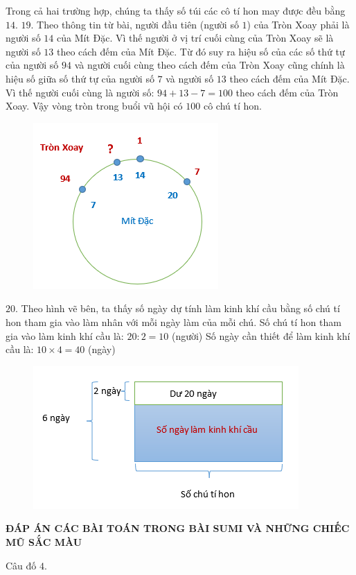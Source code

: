 Trong cả hai trường hợp, chúng ta thấy số túi các cô tí hon may được đều bằng $14$.
\vskip 0.1cm
$19$.
Theo thông tin từ bài, người đầu tiên (người số $1$) của Tròn Xoay phải là người số $14$ của Mít Đặc. Vì thế người ở vị trí cuối cùng của Tròn Xoay sẽ là người số $13$ theo cách đếm của Mít Đặc. Từ đó suy ra hiệu số của các số thứ tự của người số $94$ và người cuối cùng theo cách đếm của Tròn Xoay cũng chính là hiệu số giữa số thứ tự của người số $7$ và người số $13$  theo cách đếm của Mít Đặc. Vì thế người cuối cùng là người số: $94+ 13-7=100$ theo cách đếm của Tròn Xoay.
\vskip 0.1cm
Vậy vòng tròn trong buổi vũ hội có $100$ cô chú tí hon.
\begin{figure}[H]
	\centering
	\vspace*{-5pt}
	\captionsetup{labelformat= empty, justification=centering}
	\includegraphics[width=0.5\linewidth]{15}
	\vspace*{-15pt}
\end{figure}
$20.$ Theo hình vẽ bên, ta thấy số ngày dự tính làm kinh khí cầu bằng số chú tí hon tham gia vào làm nhân với mỗi ngày làm của mỗi chú.
Số chú tí hon tham gia vào làm kinh khí cầu là: $20 : 2 = 10$ (người)
\vskip 0.1cm
Số ngày cần thiết để làm kinh khí cầu là: $10 \times 4 = 40$ (ngày)
\begin{figure}[H]
	\centering
	\vspace*{-5pt}
	\captionsetup{labelformat= empty, justification=centering}
	\includegraphics[width=0.5\linewidth]{16}
	\vspace*{-15pt}
\end{figure}
\newpage
\begin{center}
	{}
\end{center}
\begin{center}
	\textbf{ĐÁP ÁN CÁC BÀI TOÁN TRONG BÀI SUMI VÀ NHỮNG CHIẾC MŨ SẮC MÀU}
\end{center}
Câu đố $4$. %

